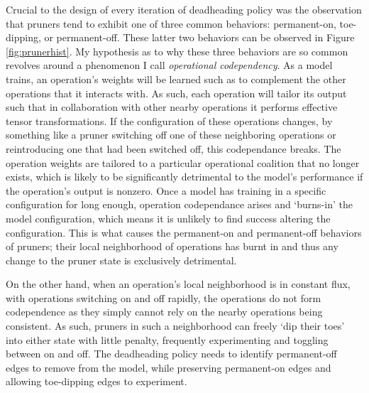 Crucial to the design of every iteration of deadheading policy was the observation that pruners tend to exhibit
one of three common behaviors: permanent-on, toe-dipping, or permanent-off.  These latter two behaviors can be
observed in Figure \ref{fig:prunerhist}.  My hypothesis as to why these three behaviors are so common revolves around
a phenomenon I call \textit{operational codependency}. As a model trains, an operation's weights will be learned such
as to complement the other operations that it interacts with. As such, each operation will tailor its output such that
in collaboration with other nearby operations it performs effective tensor transformations. If the
configuration of these operations changes, by something like a pruner switching off one of these neighboring operations
or reintroducing one that had been switched off, this codependance breaks. The operation weights are tailored to a particular
operational coalition that no longer exists, which is likely to be significantly detrimental to the model's performance if the
operation's output is nonzero. Once a
model has training in a specific configuration for long enough, operation codependance arises and `burns-in' the model
configuration, which means it is unlikely to find success altering the configuration. This is what causes the permanent-on
and permanent-off behaviors of pruners; their local neighborhood of operations has burnt in and thus any change to the
pruner state is exclusively detrimental.

On the other hand, when an operation's local neighborhood is in constant flux, with operations switching on and off
rapidly, the operations do not form codependence as they simply cannot rely on the nearby operations being consistent.
As such, pruners in such a neighborhood can freely `dip their toes' into either state with little penalty,
frequently experimenting and toggling between on and off.
The deadheading policy needs to identify permanent-off edges to remove from the model, while preserving permanent-on
edges and allowing toe-dipping edges to experiment.

